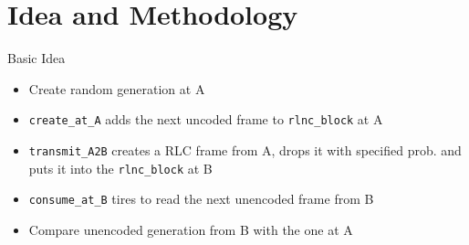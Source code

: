 \documentclass[t]{beamer} %
\begin{document}
\section{Idea and Methodology}
\begin{frame}{Basic Idea}
	\begin{figure}[htb]
	\end{figure}
	\pause
	\begin{itemize}
		\begin{itemize}
			\item Create random generation at A
			      \pause
			\item \texttt{create\_at\_A} adds the next uncoded frame to \texttt{rlnc\_block} at A
			      \pause
			\item \texttt{transmit\_A2B} creates a RLC frame from A, drops it with specified prob. and puts it into the \texttt{rlnc\_block} at B
			      \pause
			\item \texttt{consume\_at\_B} tires to read the next unencoded frame from B
			      \pause
			\item Compare unencoded generation from B with the one at A
		\end{itemize}
	\end{itemize}
\end{frame}
\end{document}
